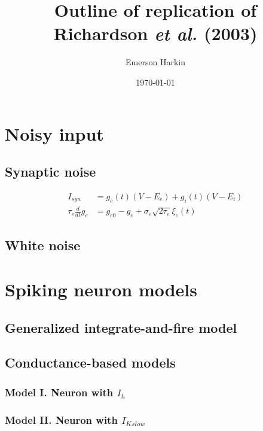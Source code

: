 \documentclass[12pt]{article}
\title{Outline of replication of Richardson \textit{et al.} (2003)}
\date{\today}
\author{Emerson Harkin}
\begin{document}
\maketitle
{}

\newpage
{}
\tableofcontents
\listoffigures
\listoftables

\newpage
{}

\section{Noisy input}

\subsection{Synaptic noise}

\begin{align}
I_{syn} &= g_e(t)(V - E_e) + g_i(t)(V - E_i) \\
\tau_e \frac{d}{dt} g_e &= g_{e0} - g_e + \sigma_e \sqrt{2 \tau_e} \xi_e(t)
\end{align}

\subsection{White noise}

\section{Spiking neuron models}

\subsection{Generalized integrate-and-fire model}

\subsection{Conductance-based models}

\subsubsection{Model I. Neuron with $I_h$}

\subsubsection{Model II. Neuron with $I_{Kslow}$}
\end{document}
